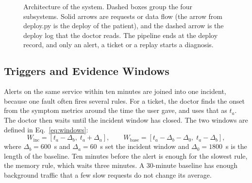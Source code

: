 \documentclass[12pt,onecolumn,draftclsnofoot]{IEEEtran}
\begin{document}
\begin{figure}[!t]
\caption{Architecture of the system. Dashed boxes group the four subsystems. Solid arrows are requests or data flow (the arrow from deploy.py is the deploy of the patient), and the dashed arrow is the deploy log that the doctor reads. The pipeline ends at the deploy record, and only an alert, a ticket or a replay starts a diagnosis.}
\label{fig:arch}
\end{figure}

\subsection{Triggers and Evidence Windows}
Alerts on the same service within ten minutes are joined into one incident, because one fault often fires several rules. For a ticket, the doctor finds the onset from the symptom metrics around the time the user gave, and uses that as $t_a$. The doctor then waits until the incident window has closed. The two windows are defined in Eq.~\eqref{eq:windows}:
\begin{equation}
W_{\mathrm{inc}}=[t_a-\Delta_b,\; t_a+\Delta_a],\qquad W_{\mathrm{base}}=[t_a-\Delta_b-\Delta_0,\; t_a-\Delta_b],
\label{eq:windows}
\end{equation}
where $\Delta_b=600$~s and $\Delta_a=60$~s set the incident window and $\Delta_0=1800$~s is the length of the baseline. Ten minutes before the alert is enough for the slowest rule, the memory rule, which waits three minutes. A 30-minute baseline has enough background traffic that a few slow requests do not change its average.
\end{document}
